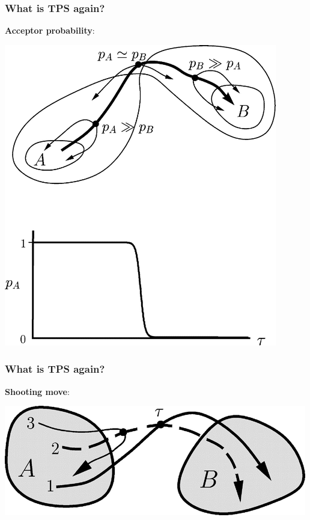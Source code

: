 \documentclass[hyperref={pdfpagelabels=false}]{beamer}
\begin{document}
\begin{frame}
\frametitle{What is TPS again?}
\textbf{Acceptor probability}:
\begin{center}
\includegraphics[scale=0.4]{images/bolhuis1.png}
\end{center}
\end{frame}

\begin{frame}
\frametitle{What is TPS again?}
\textbf{Shooting move}:
\begin{center}
\includegraphics[scale=0.5]{images/bolhuis2.png}
\end{center}
\end{frame}
\end{document}

